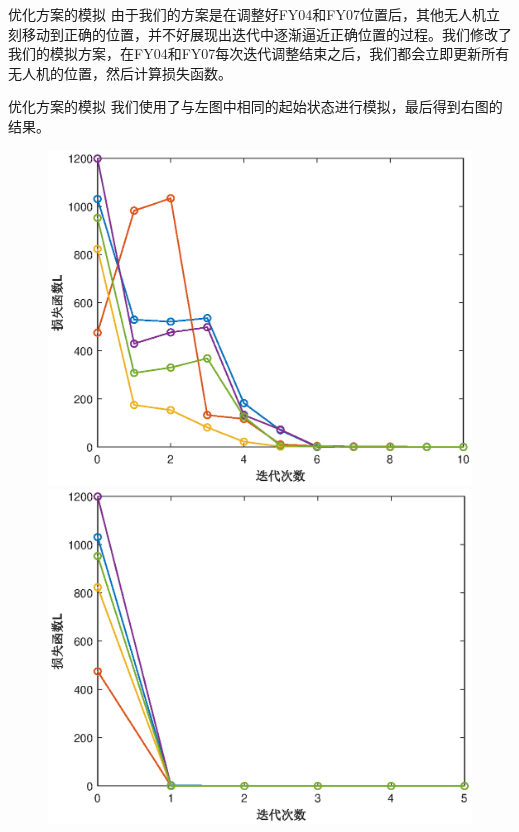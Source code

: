 \documentclass[aspectratio=169]{beamer}
\begin{document}
\begin{frame}{优化方案的模拟}
    由于我们的方案是在调整好FY04和FY07位置后，其他无人机立刻移动到正确的位置，并不好展现出迭代中逐渐逼近正确位置的过程。我们修改了我们的模拟方案，在FY04和FY07每次迭代调整结束之后，我们都会立即更新所有无人机的位置，然后计算损失函数。
\end{frame}

\begin{frame}{优化方案的模拟}
    我们使用了与左图中相同的起始状态进行模拟，最后得到右图的结果。
    \begin{figure}[!ht]
        \centering
        \begin{minipage}[t]{0.4\textwidth}
            \centering
            \includegraphics[width=\textwidth]{图片/多次尝试.eps}
        \end{minipage}
        \begin{minipage}[t]{0.4\textwidth}
            \centering
            \includegraphics[width=\textwidth]{图片/多次尝试_优化.eps}
        \end{minipage}
    \end{figure}
\end{frame}
\end{document}
